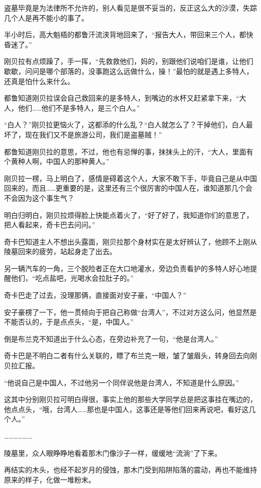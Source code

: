 盗墓毕竟是为法律所不允许的，别人看见是很不妥当的，反正这么大的沙漠，失踪几个人是再不能小的事了。

半小时后，高大魁梧的都鲁汗流浃背地回来了，“报告大人，带回来三个人，都快昏迷了。”

刚贝拉有点烦躁了，手一挥，“先救救他们，妈的，别跟他们说咱们是谁，让他们歇歇，问问是哪个部落的，没事跑这么远做什么，操！”最怕的就是遇上多特人，还真是怕什么来什么。

都鲁知道刚贝拉误会自己救回来的是多特人，到嘴边的水杯又赶紧拿下来，“大人，他们……他们不是多特人，是三个白人。”

“白人？”刚贝拉更恼火了，这都添的什么乱？“白人就怎么了？干掉他们，白人最坏了，现在我们又不是旅游公司，我们是盗墓贼！”

都鲁知道刚贝拉的意思，不过，他也有忌惮的事，抹抹头上的汗，“大人，里面有个黄种人啊，中国人的那种黄人。”

刚贝拉一楞，马上明白了，感情是碍着这个人，大家不敢下手，毕竟自己是从中国回来的，而且……更重要的是，这里还有三个很厉害的中国人在，谁知道那几个会不会因为这个事生气？

明白归明白，刚贝拉烦得脸上快能点着火了，“好了好了，我知道你们的意思了，把人看起来，奇卡巴去问问。”

奇卡巴知道主人不想出头露面，刚贝拉那个身材实在是太好辨认了，他顾不上刚从陵墓回来的疲劳，站起身走了出去。

另一辆汽车的一角，三个脱险者正在大口地灌水，旁边负责看护的多特人好心地提醒他们，“吃点盐吧，光喝水会拉肚子的。”

奇卡巴走了过去，没理那俩，直接面对安子豪，“中国人？”

安子豪楞了一下，他一贯倾向于把自己称做“台湾人”，不过对方这么问，他显然是不能否认的，于是点点头，“是，中国人。”

倒是布兰克不知道出于什么心态，在旁边补充了一句，“他是台湾人。”

奇卡巴是不明白二者有什么关联的，瞟了布兰克一眼，皱了皱眉头，转身回去向刚贝拉汇报。

“他说自己是中国人，不过他另一个同伴说他是台湾人，不知道是什么原因。”

这其中分别刚贝拉可明白得很，事实上他的那些大学同学总是把这事挂在嘴边的，他点点头，“哦，台湾人……那也是中国人，这事还是等他们回来再说吧，看好这几个人。”

………………

陵墓里，众人眼睁睁地看着那木门像沙子一样，缓缓地“流淌”了下来。

再结实的木头，也经不起岁月的侵蚀，那木门受到陷阱陷落的震动，再也不能维持原来的样子，化做一堆粉末。

